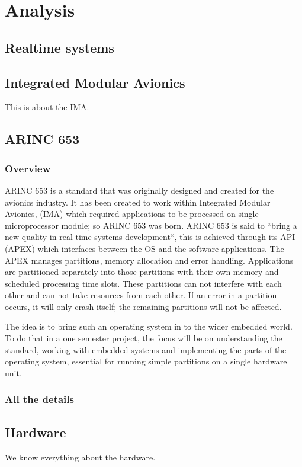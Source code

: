\chapter{Analysis}

\section{Realtime systems}

\section{Integrated Modular Avionics}
This is about the IMA.

\section{ARINC 653}
\subsection{Overview}
ARINC 653 is a standard that was originally designed and created for the avionics industry.
It has been created to work within Integrated Modular Avionics,
(IMA) which required applications to be processed on single microprocessor module; so ARINC 653 was born.
ARINC 653 is said to “bring a new quality in real-time systems development“,
this is achieved through its API (APEX) which interfaces between the OS and the software applications.
The APEX manages partitions, memory allocation and error handling.
Applications are partitioned separately into those partitions with their own memory and scheduled processing time slots.
These partitions can not interfere with each other and can not take resources from each other.
If an error in a partition occurs, it will only crash itself; the remaining partitions will not be affected.

The idea is to bring such an operating system in to the wider embedded world.
To do that in a one semester project, the focus will be on understanding the standard,
working with embedded systems and implementing the parts of the operating system,
essential for running simple partitions on a single hardware unit.

\subsection{All the details}

\section{Hardware}
We know everything about the hardware.

\section{}
